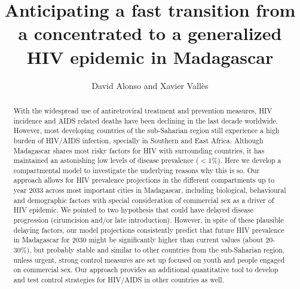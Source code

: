 \documentclass[preprint,12pt]{elsarticle}
\begin{document}
\begin{frontmatter}


\title{Anticipating a fast transition from a concentrated to a generalized HIV epidemic in Madagascar} 


\author{David Alonso and Xavier Vall\`es}


\address{Computational and Theoretical Ecology Group \\ CEAB-CSIC, Blanes, Catalonia, Spain}

\begin{abstract}
With the widespread use of antiretroviral treatment and prevention measures, HIV incidence and AIDS related deaths have been declining in the last decade worldwide. However, most developing countries of the sub-Saharian region still experience a high burden of HIV/AIDS infection, specially in Southern and East Africa. Although Madagascar shares most risky factors for HIV  with surrounding countries, it has maintained an astonishing low levels of disease prevalence ($<$1\%). Here we develop a compartmental model to investigate the underlying reasons why this is so. Our approach allows for HIV prevalence projections in the different compartments up to year 2033 across most important cities in Madagascar, including biological, behavioural and demographic factors with special consideration of commercial sex  as a driver of HIV epidemic. We pointed to two hypothesis that could have delayed disease progression (cirumcision and/or late introduction). However, in spite of these plausible delaying factors, our model projections consistently predict that future HIV prevalence in Madagascar for 2030 might be significantly higher than current values (about 20-30\%), but probably stable and similar to other countries from the sub-Saharian region, unless urgent, strong control measures are set up focused on youth and people engaged on commercial sex. Our approach provides an additional quantitative tool to develop and test control strategies for HIV/AIDS in other countries as well.
\end{abstract}


\end{frontmatter}
\end{document}
